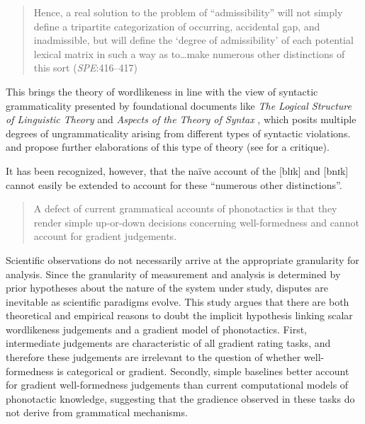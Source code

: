\begin{quote}
Hence, a real solution to the problem of ``admissibility'' will not simply define a tripartite categorization of occurring, accidental gap, and inadmissible, but will define the `degree of admissibility' of each potential lexical matrix in such a way as to\ldots{}make numerous other distinctions of this sort (\emph{SPE}:416--417)
\end{quote}

\noindent
This brings the theory of wordlikeness in line with the view of syntactic grammaticality presented by foundational documents like \emph{The Logical Structure of Linguistic Theory} \citep{LSLT} and \emph{Aspects of the Theory of Syntax} \citep{ASPECTS}, which posits multiple degrees of ungrammaticality arising from different types of syntactic violations.
\citet{BARRIERS} and \citet{Huang1982} propose further elaborations of this type of theory (see \citealt[43f.]{Schutze1996} for a critique).

It has been recognized, however, that the naïve account of the [blɪk] and [bnɪk] cannot easily be extended to account for these ``numerous other distinctions''.

\begin{quote}
A defect of current grammatical accounts of phonotactics is that they render simple up-or-down decisions concerning well-formedness and cannot account for gradient judgements. \citep[371]{Shademan2006}
\end{quote}

Scientific observations do not necessarily arrive at the appropriate granularity for analysis.
Since the granularity of measurement and analysis is determined by prior hypotheses about the nature of the system under study, disputes are inevitable as scientific paradigms evolve. 
This study argues that there are both theoretical and empirical reasons to doubt the implicit hypothesis linking scalar wordlikeness judgements and a gradient model of phonotactics. 
First, intermediate judgements are characteristic of all gradient rating tasks, and therefore these judgements are irrelevant to the question of whether well-formedness is categorical or gradient.
Secondly, simple baselines better account for gradient well-formedness judgements than current computational models of phonotactic knowledge, suggesting that the gradience observed in these tasks do not derive from grammatical mechanisms.


